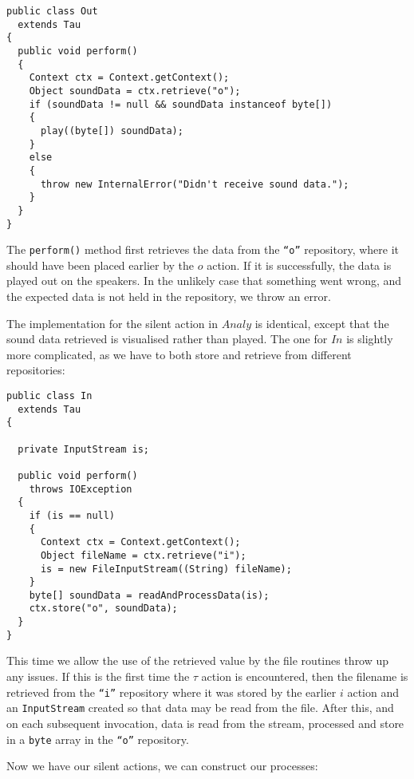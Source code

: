 \begin{verbatim}
public class Out
  extends Tau
{
  public void perform()
  {
    Context ctx = Context.getContext();
    Object soundData = ctx.retrieve("o");
    if (soundData != null && soundData instanceof byte[])
    {
      play((byte[]) soundData);
    }
    else
    {
      throw new InternalError("Didn't receive sound data.");
    }
  }
}
\end{verbatim}

The \texttt{perform()} method first retrieves the data from the
\texttt{``o''} repository, where it should have been placed earlier by
the $o$ action.  If it is successfully, the data is played out on the
speakers.  In the unlikely case that something went wrong, and the
expected data is not held in the repository, we throw an error.

The implementation for the silent action in $Analy$ is identical,
except that the sound data retrieved is visualised rather than played.
The one for $In$ is slightly more complicated, as we have to both
store and retrieve from different repositories:

\begin{verbatim}
public class In
  extends Tau
{

  private InputStream is;

  public void perform()
    throws IOException
  {
    if (is == null)
    {
      Context ctx = Context.getContext();
      Object fileName = ctx.retrieve("i");
      is = new FileInputStream((String) fileName);
    }
    byte[] soundData = readAndProcessData(is);
    ctx.store("o", soundData);
  }
}
\end{verbatim}

This time we allow the use of the retrieved value by the file routines
throw up any issues.  If this is the first time the $\tau$ action is
encountered, then the filename is retrieved from the \texttt{``i''}
repository where it was stored by the earlier $i$ action and an
\texttt{InputStream} created so that data may be read from the file.
After this, and on each subsequent invocation, data is read from the
stream, processed and store in a \texttt{byte} array in the
\texttt{``o''} repository.

Now we have our silent actions, we can construct our processes:

